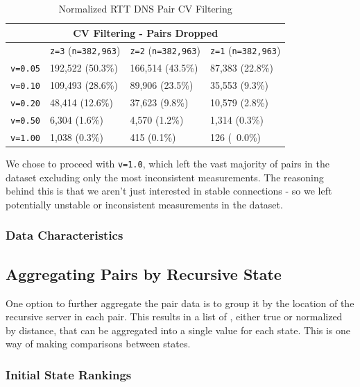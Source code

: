 \begin{table}[H]
    \centering
    \begin{tabular}{ |p{1.6cm}|p{4cm}|p{4cm}|p{4cm}| }
        \hline
        \multicolumn{4}{|c|}{CV Filtering - Pairs Dropped} \\
        \hline
         & \texttt{z=3} (\texttt{n=382,963}) & \texttt{z=2} (\texttt{n=382,963}) & \texttt{z=1} (\texttt{n=382,963}) \\
        \hline
        \texttt{v=0.05} & 192,522 (50.3\%) & 166,514 (43.5\%) & 87,383 (22.8\%) \\
        \texttt{v=0.10} & 109,493 (28.6\%) & 89,906 (23.5\%) & 35,553 (9.3\%) \\
        \texttt{v=0.20} & 48,414 (12.6\%) & 37,623 (9.8\%) & 10,579 (2.8\%) \\
        \texttt{v=0.50} & 6,304 (1.6\%) & 4,570 (1.2\%) & 1,314 (0.3\%) \\
        \texttt{v=1.00} & 1,038 (0.3\%) &    415 (0.1\%) & 126 (~0.0\%) \\  
        \hline
    \end{tabular}
    \caption{Normalized RTT DNS Pair CV Filtering}
    \label{tab:dns_norm_cv_filtering}
\end{table}

We chose to proceed with \texttt{v=1.0}, which left the vast majority of pairs in the dataset excluding only the most inconsistent measurements. The reasoning behind this is that we aren't just interested in stable connections - so we left potentially unstable or inconsistent measurements in the dataset.

\subsubsection{Data Characteristics}

\subsection{Aggregating Pairs by Recursive State}

One option to further aggregate the pair data is to group it by the location of the recursive server in each pair. This results in a list of \rtts, either true or normalized by distance, that can be aggregated into a single value for each state. This is one way of making comparisons between states.

\subsubsection{Initial State Rankings}


